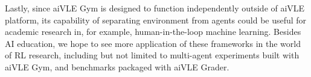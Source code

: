 Lastly, since aiVLE Gym is designed to function independently outside of aiVLE platform, its capability of separating environment from agents could be useful for academic research in, for example, human-in-the-loop machine learning. Besides AI education, we hope to see more application of these frameworks in the world of RL research, including but not limited to multi-agent experiments built with aiVLE Gym, and benchmarks packaged with aiVLE Grader.
